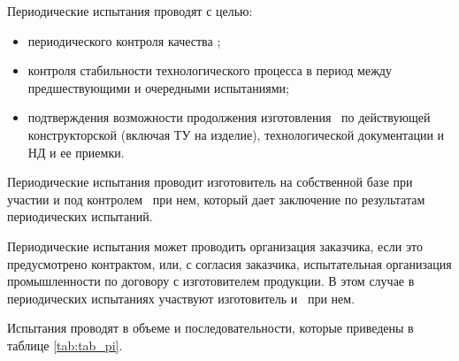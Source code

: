 \point
Периодические испытания проводят с целью:
%
\begin{itemize}
	\item периодического контроля качества \dut;
	\item контроля стабильности технологического процесса в период между предшествующими и очередными испытаниями;
	\item подтверждения возможности продолжения изготовления \dut \ по действующей конструкторской (включая ТУ на изделие), технологической документации и НД и ее приемки.
\end{itemize}

\point
Периодические испытания проводит изготовитель на собственной базе при участии и под контролем \client \ при нем, который дает заключение по результатам периодических испытаний.

Периодические испытания может проводить организация заказчика, если это предусмотрено контрактом, или, с согласия заказчика, испытательная организация промышленности по договору с изготовителем продукции. В этом случае в периодических испытаниях участвуют изготовитель и \client \ при нем.

\point
Испытания проводят в объеме и последовательности, которые приведены в таблице \ref{tab:tab_pi}.

